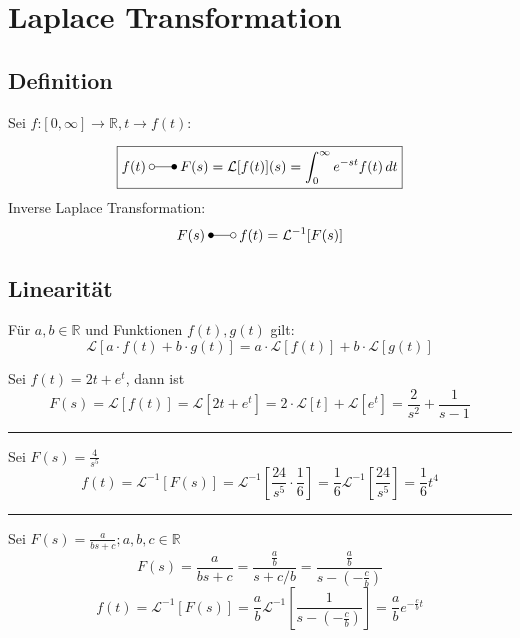 \section{Laplace Transformation}
\subsection{Definition}
Sei $f$:$[0,\infty] \rightarrow \mathbb{R}, t \rightarrow f(t)$:

\begin{equation*}
    \boxed{
    f(t)\:\laplace\:F(s)=\mathcal{L}[f(t)](s)=\int_{0}^{\infty}e^{-st}f(t)\,dt 
    }
\end{equation*}
Inverse Laplace Transformation:
\begin{equation*}
    F(s)\:\Laplace\:f(t)=\mathcal{L}^{-1}[F(s)]
\end{equation*}

\subsection{Linearität}
Für $a,b \in \mathbb{R}$ und Funktionen $f(t),g(t)$ gilt:
\begin{equation*}
    \mathcal{L}[a\cdot f(t)+b\cdot g(t)] = a\cdot\mathcal{L}[f(t)]+b\cdot\mathcal{L}[g(t)]
\end{equation*}

\begin{examplesection}[Beispiele]
    Sei $f(t)=2t+e^t$, dann ist
    \begin{equation*}
        F(s)=\mathcal{L}[f(t)]=\mathcal{L}[2t+e^t]=2\cdot\mathcal{L}[t] + \mathcal{L}[e^t]=\frac{2}{s^2}+\frac{1}{s-1}
    \end{equation*}
    \hrule{}
    Sei $F(s)=\frac{4}{s^5}$
    \begin{equation*}
        f(t)=\mathcal{L}^{-1}[F(s)]=\mathcal{L}^{-1}\left[\frac{24}{s^5}\cdot\frac16\right]=\frac16\mathcal{L}^{-1}\left[\frac{24}{s^5}\right]=\frac16t^4
    \end{equation*}
    \hrule{}
    Sei $F(s)=\frac{a}{bs+c}; a,b,c \in \mathbb{R}$
    \begin{equation*}
        F(s)=\frac{a}{bs+c}=\frac{\frac{a}{b}}{s+c/b}=\frac{\frac{a}{b}}{s-(-\frac{c}{b})}
    \end{equation*}
    \begin{equation*}
        f(t)=\mathcal{L}^{-1}[F(s)]=\frac{a}{b}\mathcal{L}^{-1}\left[\frac{1}{s-(-\frac{c}{b})}\right]=\frac{a}{b}e^{-\frac{c}{b}t}
    \end{equation*}
\end{examplesection}

